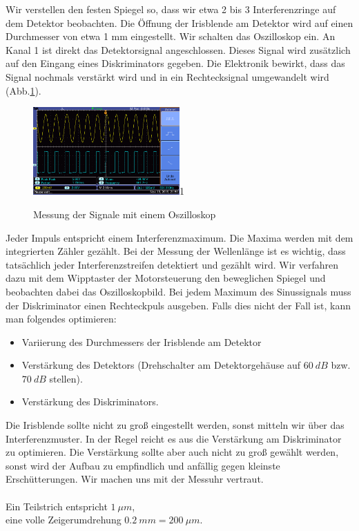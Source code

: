 \documentclass[a4paper,10pt]{article}
\begin{document}
Wir verstellen den festen Spiegel so, dass wir etwa 2 bis 3 Interferenzringe auf dem Detektor beobachten. Die Öffnung der Irisblende am Detektor wird auf einen Durchmesser von etwa 1 mm eingestellt. Wir schalten das Oszilloskop ein. An Kanal 1 ist direkt das Detektorsignal angeschlossen. Dieses Signal wird zusätzlich auf den Eingang eines Diskriminators gegeben. Die Elektronik bewirkt, dass das Signal nochmals verstärkt wird und in ein Rechtecksignal umgewandelt wird (Abb.\ref{fig:pic1}).\\

\begin{figure}
  \centering
  \begin{annotate}{\includegraphics[width=0.5\textwidth]{pic1.png}}{1}
  \end{annotate}
    \caption{Messung der Signale mit einem Oszilloskop}
 \label{fig:pic1}
\end{figure} 
Jeder Impuls entspricht einem Interferenzmaximum. Die Maxima werden mit dem integrierten Zähler gezählt. Bei der Messung der Wellenlänge ist es wichtig, dass tatsächlich jeder Interferenzstreifen detektiert und gezählt wird. Wir verfahren dazu mit dem Wipptaster der Motorsteuerung den beweglichen Spiegel und beobachten dabei das Oszilloskopbild. Bei jedem Maximum des Sinussignals muss der Diskriminator einen Rechteckpuls ausgeben. Falls dies nicht der Fall ist, kann man folgendes optimieren:
\begin{itemize}
\item Variierung des Durchmessers der Irisblende am Detektor
\item Verstärkung des Detektors (Drehschalter am Detektorgehäuse auf \(60\: dB\) bzw. \(70\: dB\) stellen).
\item Verstärkung des Diskriminators.
\end{itemize}

Die Irisblende sollte nicht zu groß eingestellt werden, sonst mitteln wir über das Interferenzmuster. In der Regel reicht es aus die Verstärkung am Diskriminator zu optimieren. Die Verstärkung sollte aber auch nicht zu groß gewählt werden, sonst wird der Aufbau zu empfindlich und anfällig gegen kleinste
Erschütterungen. Wir machen uns mit der Messuhr vertraut.\\\\
Ein Teilstrich entspricht \(1\: {\mu m}\),\\ eine
volle Zeigerumdrehung  \(0.2\:mm= 200\: {\mu m}\). \\
\end{document}
